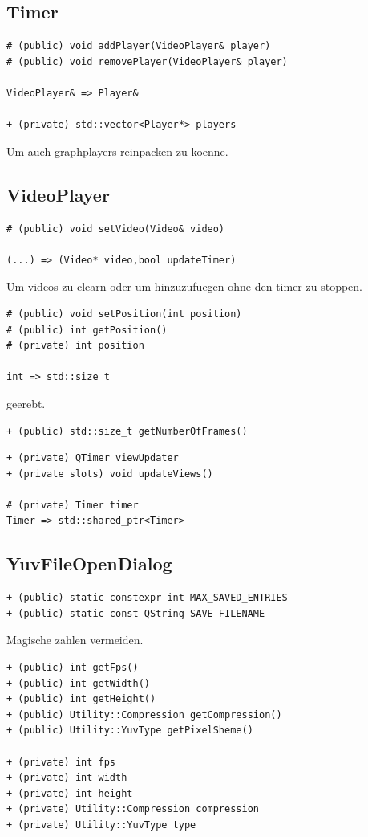 \documentclass{scrartcl}
\begin{document}
{\subsection{Timer}
\begin{verbatim}
# (public) void addPlayer(VideoPlayer& player)
# (public) void removePlayer(VideoPlayer& player)

VideoPlayer& => Player&

+ (private) std::vector<Player*> players
\end{verbatim}
Um auch graphplayers reinpacken zu koenne.
\subsection{VideoPlayer}
\begin{verbatim}
# (public) void setVideo(Video& video)

(...) => (Video* video,bool updateTimer)
\end{verbatim}
Um videos zu clearn oder um hinzuzufuegen ohne den timer zu stoppen.
\begin{verbatim}
# (public) void setPosition(int position)
# (public) int getPosition()
# (private) int position

int => std::size_t
\end{verbatim}
geerebt.
\begin{verbatim}
+ (public) std::size_t getNumberOfFrames()
\end{verbatim}
\begin{verbatim}
+ (private) QTimer viewUpdater
+ (private slots) void updateViews()

# (private) Timer timer
Timer => std::shared_ptr<Timer>
\end{verbatim}
\subsection{YuvFileOpenDialog}
\begin{verbatim}
+ (public) static constexpr int MAX_SAVED_ENTRIES
+ (public) static const QString SAVE_FILENAME
\end{verbatim}
Magische zahlen vermeiden.
\begin{verbatim}
+ (public) int getFps()
+ (public) int getWidth()
+ (public) int getHeight()
+ (public) Utility::Compression getCompression()
+ (public) Utility::YuvType getPixelSheme()

+ (private) int fps
+ (private) int width
+ (private) int height
+ (private) Utility::Compression compression
+ (private) Utility::YuvType type


\end{verbatim}}
\end{document}
